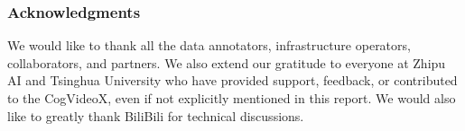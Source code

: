 \documentclass{article}
\newcommand{\model}{CogVideoX\xspace}
\begin{document}













 
\subsubsection*{Acknowledgments}

We would like to thank all the data annotators, infrastructure operators, collaborators, and partners. We also extend our gratitude to everyone at Zhipu AI and Tsinghua University who have provided support, feedback, or contributed to the \model, even if not explicitly mentioned in this report.
We would also like to greatly thank BiliBili for technical discussions. 







\clearpage
\appendix






\end{document}
